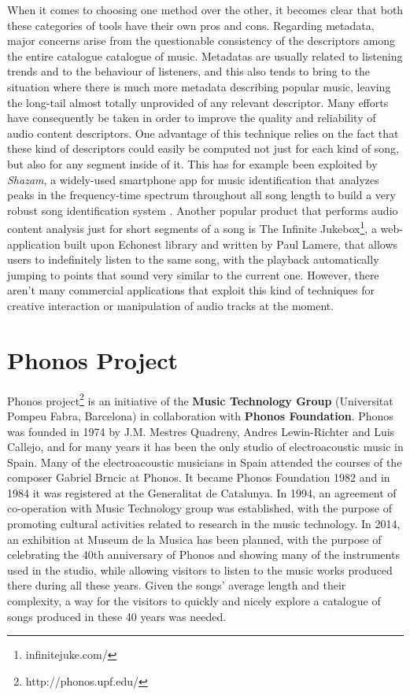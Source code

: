 When it comes to choosing one method over the other, it becomes clear that both these categories of tools have their own pros and cons. Regarding metadata, major concerns arise from the questionable consistency of the descriptors among the entire catalogue catalogue of music. Metadatas are usually related to listening trends and to the behaviour of listeners, and this also tends to bring to the situation where there is much more metadata describing popular music, leaving the long-tail almost totally unprovided of any relevant descriptor. Many efforts have consequently be taken in order to improve the quality and reliability of audio content descriptors. One advantage of this technique relies on the fact that these kind of descriptors could easily be computed not just for each kind of song, but also for any segment inside of it. This has for example been exploited by \textit{Shazam}, a widely-used smartphone app for music identification that analyzes peaks in the frequency-time spectrum throughout all song length to build a very robust song identification system \cite{shazam03}. Another popular product that performs audio content analysis just for short segments of a song is The Infinite Jukebox\footnote{infinitejuke.com/}, a web-application built upon Echonest library and written by Paul Lamere, that allows users to indefinitely listen to the same song, with the playback automatically jumping to points that sound very similar to the current one. However, there aren't many commercial applications that exploit this kind of techniques for creative interaction or manipulation of audio tracks at the moment.


\section{Phonos Project}
Phonos project\footnote{http://phonos.upf.edu/} is an initiative of the \textbf{Music Technology Group} (Universitat Pompeu Fabra, Barcelona) in collaboration with \textbf{Phonos Foundation}. Phonos was founded in 1974 by J.M. Mestres Quadreny, Andres Lewin-Richter and Luis Callejo, and for many years it has been the only studio of electroacoustic music in Spain. Many of the electroacoustic musicians in Spain attended the courses of the composer Gabriel Brncic at Phonos. It became Phonos Foundation 1982 and in 1984 it was registered at the Generalitat de Catalunya. In 1994, an agreement of co-operation with Music Technology group was established, with the purpose of promoting cultural activities related to research in the music technology. 
In 2014, an exhibition at Museum de la Musica has been planned, with the purpose of celebrating the 40th anniversary of Phonos and showing many of the instruments used in the studio, while allowing visitors to listen to the music works produced there during all these years. Given the songs' average length and their complexity, a way for the visitors to quickly and nicely explore a catalogue of songs produced in these 40 years was needed.

